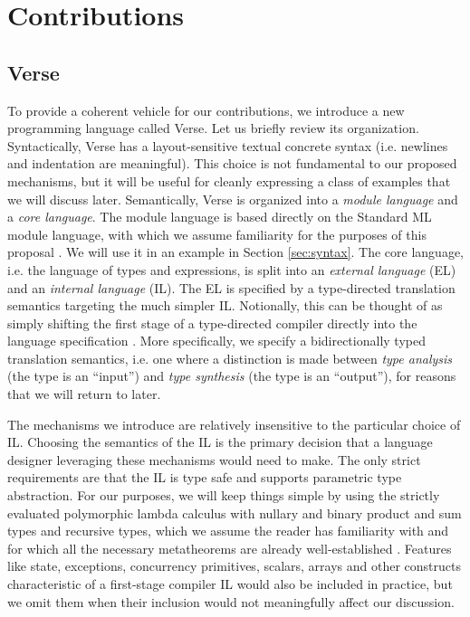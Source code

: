 \section{Contributions}
\subsection{Verse}
To provide a coherent vehicle for our contributions, we introduce a new programming language called Verse. Let us briefly review its organization. Syntactically, Verse has a layout-sensitive textual concrete syntax (i.e. newlines and indentation are meaningful). This choice is not fundamental to our proposed mechanisms, but it will be useful for cleanly expressing a class of examples that we will discuss later.  Semantically, Verse is organized into a \emph{module language} and a \emph{core language}. The module language is based directly on the Standard ML module language, with which we assume familiarity for the purposes of this proposal \cite{harper1997programming}. We will use it in an example in Section \ref{sec:syntax}. The core language, i.e. the language of types and expressions, is split into an \emph{external language} (EL) and an \emph{internal language} (IL). The EL  is specified by a type-directed translation semantics targeting the much simpler IL. Notionally, this can be thought of as simply shifting the first stage of a type-directed compiler directly into the language specification \cite{tarditi+:til-OLD}. More specifically, we specify a {bidirectionally typed translation semantics}, i.e. one where a distinction is made between \emph{type analysis} (the type is an ``input'') and \emph{type synthesis} (the type is an ``output''), for reasons that we will return to later.

The mechanisms we introduce are relatively insensitive to the particular choice of IL. Choosing the semantics of the IL is the primary decision that a language designer leveraging these mechanisms would need to make. The only strict requirements are that the IL is type safe and supports parametric type abstraction. For our purposes, we will keep things simple by using the strictly evaluated polymorphic lambda calculus with nullary and binary product and sum types and recursive types, which we assume the reader has familiarity with and for which all the necessary metatheorems are already well-established \cite{pfpl}. Features like state, exceptions, concurrency primitives, scalars, arrays and other constructs characteristic of a first-stage compiler IL would also be included in practice, but we omit them when their inclusion would not meaningfully affect our discussion.

